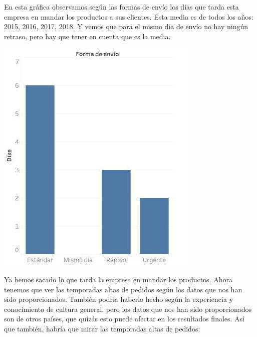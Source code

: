 \documentclass{article}
\begin{document}
En esta gráfica observamos según las formas de envío los días que tarda esta empresa en mandar los productos a sus clientes. Esta media es de todos los años: 2015, 2016, 2017, 2018. Y vemos que para el mismo día de envío no hay ningún retraso, pero hay que tener en cuenta que es la media.

\includegraphics[scale=0.25]{imagenes/H4.jpg} 

Ya hemos sacado lo que tarda la empresa en mandar los productos. Ahora tenemos que ver las temporadas altas de pedidos según los datos que nos han sido proporcionados. También podría haberlo hecho según la experiencia y conocimiento de cultura general, pero los datos que nos han sido proporcionados son de otros países, que quizás esto puede afectar en los resultados finales. Así que también, habría que mirar las temporadas altas de pedidos: 
\end{document}
